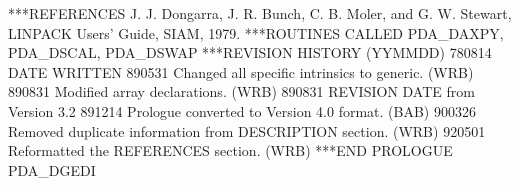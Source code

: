 \documentclass[11pt,twoside,nolof]{starlink}
\begin{document}
\begin{terminalv}
***REFERENCES  J. J. Dongarra, J. R. Bunch, C. B. Moler, and G. W.
                 Stewart, LINPACK Users' Guide, SIAM, 1979.
***ROUTINES CALLED  PDA_DAXPY, PDA_DSCAL, PDA_DSWAP
***REVISION HISTORY  (YYMMDD)
   780814  DATE WRITTEN
   890531  Changed all specific intrinsics to generic.  (WRB)
   890831  Modified array declarations.  (WRB)
   890831  REVISION DATE from Version 3.2
   891214  Prologue converted to Version 4.0 format.  (BAB)
   900326  Removed duplicate information from DESCRIPTION section.
           (WRB)
   920501  Reformatted the REFERENCES section.  (WRB)
***END PROLOGUE  PDA_DGEDI
\end{terminalv}


\end{document}
